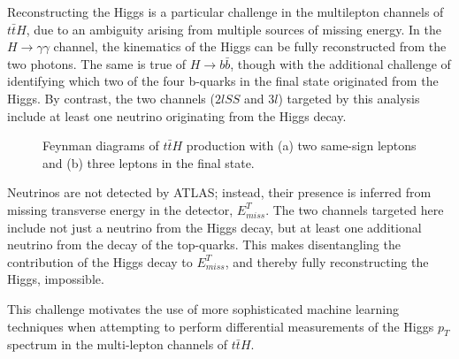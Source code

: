 Reconstructing the Higgs is a particular challenge in the multilepton channels of $t\bar{t}H$, due to an ambiguity arising from multiple sources of missing energy. In the $H\rightarrow \gamma\gamma$ channel, the kinematics of the Higgs can be fully reconstructed from the two photons. The same is true of $H\rightarrow b\bar{b}$, though with the additional challenge of identifying which two of the four b-quarks in the final state originated from the Higgs. By contrast, the two channels ($2lSS$ and $3l$) targeted by this analysis include at least one neutrino originating from the Higgs decay. 

\begin{figure}[H]
    \centering
    \caption{Feynman diagrams of $t\bar{t}H$ production with (a) two same-sign leptons and (b) three leptons in the final state.}
    \label{fig:ttH-2lSS-3l}
\end{figure}

Neutrinos are not detected by ATLAS; instead, their presence is inferred from missing transverse energy in the detector, $E^T_{miss}$. The two channels targeted here include not just a neutrino from the Higgs decay, but at least one additional neutrino from the decay of the top-quarks. This makes disentangling the contribution of the Higgs decay to $E^T_{miss}$, and thereby fully reconstructing the Higgs, impossible. 

This challenge motivates the use of more sophisticated machine learning techniques when attempting to perform differential measurements of the Higgs $p_T$ spectrum in the multi-lepton channels of $t\bar{t}H$.


